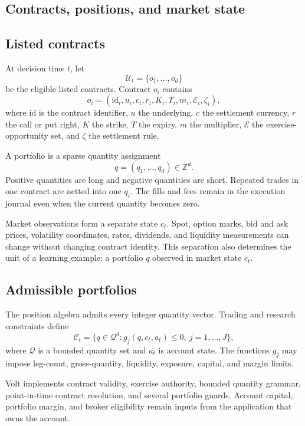 \documentclass{strategynet-journal}
\newcommand{\VOLT}{\textsf{Volt}}
\newcommand{\Z}{\mathbb{Z}}
\begin{document}
\begin{SNcolumns}
\section{Contracts, positions, and market state}
\label{sec:portfolio}

\subsection{Listed contracts}

At decision time \(t\), let
\[
  \mathcal U_t=\{o_1,\ldots,o_d\}
\]
be the eligible listed contracts.  Contract \(o_i\) contains
\[
  o_i=(\mathrm{id}_i,u_i,c_i,r_i,K_i,T_i,m_i,
       \mathcal E_i,\zeta_i),
\]
where \(\mathrm{id}\) is the contract identifier, \(u\) the underlying, \(c\)
the settlement currency, \(r\) the call or put right, \(K\) the strike, \(T\)
the expiry, \(m\) the multiplier, \(\mathcal E\) the exercise-opportunity set,
and \(\zeta\) the settlement rule.

A portfolio is a sparse quantity assignment
\[
  q=(q_1,\ldots,q_d)\in\Z^d.
\]
Positive quantities are long and negative quantities are short.  Repeated
trades in one contract are netted into one \(q_i\).  The fills and fees remain
in the execution journal even when the current quantity becomes zero.

Market observations form a separate state \(c_t\).  Spot, option marks, bid
and ask prices, volatility coordinates, rates, dividends, and liquidity
measurements can change without changing contract identity.  This separation
also determines the unit of a learning example: a portfolio \(q\) observed in
market state \(c_t\).

\subsection{Admissible portfolios}

The position algebra admits every integer quantity vector.  Trading and
research constraints define
\[
  \mathcal C_t
  =\{q\in\mathcal Q^d:g_j(q,c_t,a_t)\leq0,\ j=1,\ldots,J\},
\]
where \(\mathcal Q\) is a bounded quantity set and \(a_t\) is account state.
The functions \(g_j\) may impose leg-count, gross-quantity, liquidity,
exposure, capital, and margin limits.

\VOLT{} implements contract validity, exercise authority, bounded quantity
grammar, point-in-time contract resolution, and several portfolio guards.
Account capital, portfolio margin, and broker eligibility remain inputs from
the application that owns the account.

\end{SNcolumns}
\end{document}
